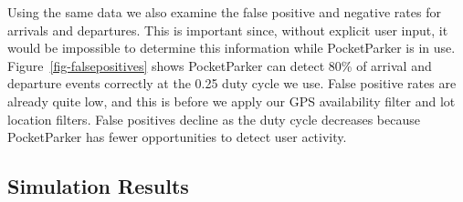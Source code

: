 Using the same data we also examine the false positive and negative rates for
arrivals and departures. This is important since, without explicit user
input, it would be impossible to determine this information while
PocketParker is in use. Figure~\ref{fig-falsepositives} shows PocketParker
can detect 80\% of arrival and departure events correctly at the 0.25 duty
cycle we use. False positive rates are already quite low, and this is before
we apply our GPS availability filter and lot location filters. False
positives decline as the duty cycle decreases because PocketParker has fewer
opportunities to detect user activity.

\subsection{Simulation Results}
\label{subsec-simulator}

